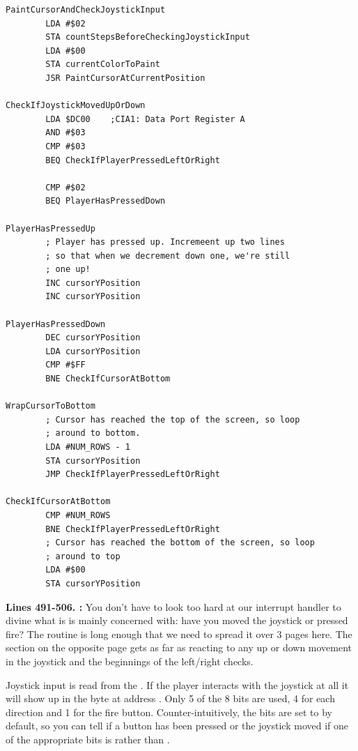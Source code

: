 {\begin{lstlisting}[caption= This is our interrupt handler\, it runs 60 times a second so has to be fast.]
PaintCursorAndCheckJoystickInput   
        LDA #$02
        STA countStepsBeforeCheckingJoystickInput
        LDA #$00
        STA currentColorToPaint
        JSR PaintCursorAtCurrentPosition

CheckIfJoystickMovedUpOrDown   
        LDA $DC00    ;CIA1: Data Port Register A
        AND #$03
        CMP #$03
        BEQ CheckIfPlayerPressedLeftOrRight

        CMP #$02
        BEQ PlayerHasPressedDown

PlayerHasPressedUp
        ; Player has pressed up. Incremeent up two lines
        ; so that when we decrement down one, we're still
        ; one up!
        INC cursorYPosition
        INC cursorYPosition

PlayerHasPressedDown   
        DEC cursorYPosition
        LDA cursorYPosition
        CMP #$FF
        BNE CheckIfCursorAtBottom

WrapCursorToBottom
        ; Cursor has reached the top of the screen, so loop
        ; around to bottom.
        LDA #NUM_ROWS - 1
        STA cursorYPosition
        JMP CheckIfPlayerPressedLeftOrRight

CheckIfCursorAtBottom   
        CMP #NUM_ROWS
        BNE CheckIfPlayerPressedLeftOrRight
        ; Cursor has reached the bottom of the screen, so loop
        ; around to top
        LDA #$00
        STA cursorYPosition

\end{lstlisting}
\clearpage

\textbf{Lines 491-506. :}  You don't have to look too hard at our interrupt handler
to divine what is is mainly concerned with: have you moved the joystick or pressed fire? The routine is long enough
that we need to spread it over 3 pages here. The section on the opposite page gets as far as reacting to any up or
down movement in the joystick and the beginnings of the left/right checks. 

Joystick input is read from the . If the player interacts with the joystick at all it will
show up in the byte at address . Only 5 of the 8 bits are used, 4 for each direction and 1 for the fire button.
Counter-intuitively, the bits are set to  by default, so you can tell if a button has been pressed or the joystick moved
if one of the appropriate bits is  rather than .

\begin{figure}[H]
  {
    \setlength{\tabcolsep}{3.0pt}
    \setlength\cmidrulewidth{\heavyrulewidth} %
    \begin{adjustbox}{width=7cm,center}


\end{adjustbox}}
\end{figure}}
